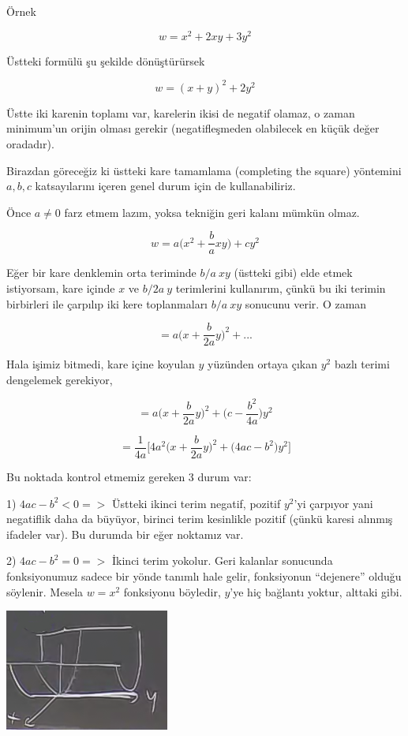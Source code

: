 \documentclass[12pt,fleqn]{article}\usepackage{../../common}
\begin{document}
Örnek

$$ w = x^2 + 2xy + 3y^2 $$

Üstteki formülü şu şekilde dönüştürürsek

$$ w = (x+y)^2 + 2y^2 $$

Üstte iki karenin toplamı var, karelerin ikisi de negatif olamaz, o zaman
minimum'un orijin olması gerekir (negatifleşmeden olabilecek en küçük değer
oradadır). 

Birazdan göreceğiz ki üstteki kare tamamlama (completing the square)
yöntemini $a,b,c$ katsayılarını içeren genel durum için de kullanabiliriz. 

Önce $a \ne 0$ farz etmem lazım, yoksa tekniğin geri kalanı mümkün olmaz. 

$$ w = a \bigg( x^2 + \frac{b}{a} xy \bigg) + cy^2 $$

Eğer bir kare denklemin orta teriminde $b/a \ xy$ (üstteki gibi) elde etmek
istiyorsam, kare içinde $x$ ve $b/2a \ y$ terimlerini kullanırım, çünkü bu iki
terimin birbirleri ile çarpılıp iki kere toplanmaları $b/a \ xy$ sonucunu
verir. O zaman

$$ = a \bigg( x + \frac{b}{2a}y  \bigg)^2  + ... $$

Hala işimiz bitmedi, kare içine koyulan $y$ yüzünden ortaya çıkan $y^2$ bazlı
terimi dengelemek gerekiyor,

$$ = a \bigg( x + \frac{b}{2a}y  \bigg)^2  + 
\bigg( c - \frac{b^2}{4a} \bigg)y^2
$$


$$ = \frac{1}{4a} 
\bigg[
4a^2 \bigg( x+\frac{b}{2a}y \bigg)^2 +
\bigg(4ac - b^2 \bigg)y^2
\bigg]
$$

Bu noktada kontrol etmemiz gereken 3 durum var:

1) $4ac - b^2 < 0 => $ Üstteki ikinci terim negatif, pozitif $y^2$'yi
çarpıyor yani negatiflik daha da büyüyor, birinci terim kesinlikle pozitif
(çünkü karesi alınmış ifadeler var). Bu durumda bir eğer noktamız var. 

2) $4ac - b^2 = 0 => $ İkinci terim yokolur. Geri kalanlar sonucunda
fonksiyonumuz sadece bir yönde tanımlı hale gelir, fonksiyonun ``dejenere''
olduğu söylenir. Mesela $w = x^2$ fonksiyonu böyledir, $y$'ye hiç bağlantı
yoktur, alttaki gibi.

\includegraphics[height=4cm]{10_2.png}
\end{document}
